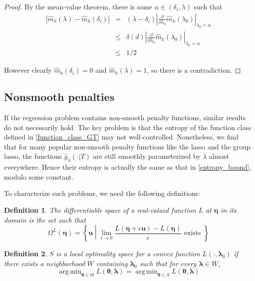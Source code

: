 \documentclass[12pt]{article}
\newtheorem{definition}{Definition}
\DeclareMathOperator*{\argmin}{arg\,min}
\begin{document}
\begin{proof}
By the mean-value theorem, there is some $\alpha\in(\delta_{i},\lambda)$ such that 
\begin{eqnarray}
| \hat{m}_{h}(\lambda) - \hat{m}_{h}(\delta_{i}) | &=& (\lambda-\delta_{i})\left|\frac{\partial}{\partial\lambda_{0}}\hat{m}_{h}(\lambda_{0})\right|_{\lambda_{0}=\alpha} \\
&\le& \delta(d) \left|\frac{\partial}{\partial\lambda_{0}}\hat{m}_{h}(\lambda_{0})\right|_{\lambda_{0}=\alpha}\\
&\le& 1/2
\end{eqnarray}

However clearly $\hat{m}_{h}(\delta_{i})=0$ and $\hat{m}_{h}(\lambda)=1$, so there is a contradiction.
\end{proof}

\subsection{Nonsmooth penalties}\label{sec:nonsmooth}

If the regression problem contains non-smooth penalty functions, similar results do not necessarily hold. The key problem is that the entropy of the function class defined in \eqref{function_class_GT} may not well-controlled. Nonetheless, we find that for many popular non-smooth penalty functions like the lasso and the group lasso, the functions $\hat{g}_\lambda(\cdot | T)$ are still smoothly parameterized by $\lambda$ almost everywhere. Hence their entropy is actually the same as that in \eqref{entropy_bound}, modulo some constant.

To characterize such problems, we need the following definitions:

\begin{definition}
The differentiable space of a real-valued function $L$ at $\boldsymbol \eta$ in its domain is the set such that
\begin{equation}
\Omega^{L}(\boldsymbol \eta) = \left \{ \boldsymbol u \middle | \lim_{\epsilon \rightarrow 0} \frac{L(\boldsymbol \eta + \epsilon \boldsymbol u) - L(\boldsymbol \eta)}{\epsilon} \text{ exists } \right \}
\end{equation}
\end{definition}

\begin{definition}
$S$ is a local optimality space for a convex function $L(\cdot, \boldsymbol \lambda_0)$ if there exists a neighborhood $W$ containing $\boldsymbol \lambda_0$ such that for every $\boldsymbol \lambda \in W$,
\begin{equation}
\argmin_{\boldsymbol \theta \in \Theta} L(\boldsymbol \theta, \boldsymbol \lambda) =
\argmin_{\boldsymbol \theta \in S} L(\boldsymbol \theta, \boldsymbol \lambda)
\end{equation}

\end{definition}
\end{document}
